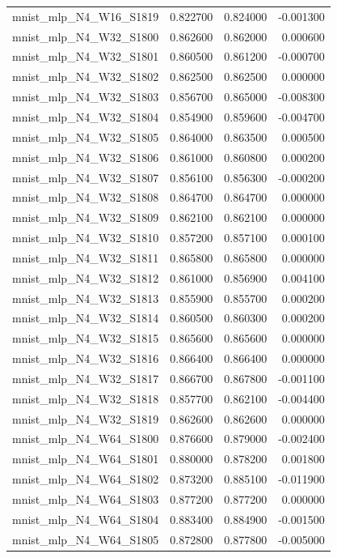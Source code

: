 \begin{tabular}{lrrr}
mnist_mlp_N4_W16_S1819 & 0.822700 & 0.824000 & -0.001300 \\
mnist_mlp_N4_W32_S1800 & 0.862600 & 0.862000 & 0.000600 \\
mnist_mlp_N4_W32_S1801 & 0.860500 & 0.861200 & -0.000700 \\
mnist_mlp_N4_W32_S1802 & 0.862500 & 0.862500 & 0.000000 \\
mnist_mlp_N4_W32_S1803 & 0.856700 & 0.865000 & -0.008300 \\
mnist_mlp_N4_W32_S1804 & 0.854900 & 0.859600 & -0.004700 \\
mnist_mlp_N4_W32_S1805 & 0.864000 & 0.863500 & 0.000500 \\
mnist_mlp_N4_W32_S1806 & 0.861000 & 0.860800 & 0.000200 \\
mnist_mlp_N4_W32_S1807 & 0.856100 & 0.856300 & -0.000200 \\
mnist_mlp_N4_W32_S1808 & 0.864700 & 0.864700 & 0.000000 \\
mnist_mlp_N4_W32_S1809 & 0.862100 & 0.862100 & 0.000000 \\
mnist_mlp_N4_W32_S1810 & 0.857200 & 0.857100 & 0.000100 \\
mnist_mlp_N4_W32_S1811 & 0.865800 & 0.865800 & 0.000000 \\
mnist_mlp_N4_W32_S1812 & 0.861000 & 0.856900 & 0.004100 \\
mnist_mlp_N4_W32_S1813 & 0.855900 & 0.855700 & 0.000200 \\
mnist_mlp_N4_W32_S1814 & 0.860500 & 0.860300 & 0.000200 \\
mnist_mlp_N4_W32_S1815 & 0.865600 & 0.865600 & 0.000000 \\
mnist_mlp_N4_W32_S1816 & 0.866400 & 0.866400 & 0.000000 \\
mnist_mlp_N4_W32_S1817 & 0.866700 & 0.867800 & -0.001100 \\
mnist_mlp_N4_W32_S1818 & 0.857700 & 0.862100 & -0.004400 \\
mnist_mlp_N4_W32_S1819 & 0.862600 & 0.862600 & 0.000000 \\
mnist_mlp_N4_W64_S1800 & 0.876600 & 0.879000 & -0.002400 \\
mnist_mlp_N4_W64_S1801 & 0.880000 & 0.878200 & 0.001800 \\
mnist_mlp_N4_W64_S1802 & 0.873200 & 0.885100 & -0.011900 \\
mnist_mlp_N4_W64_S1803 & 0.877200 & 0.877200 & 0.000000 \\
mnist_mlp_N4_W64_S1804 & 0.883400 & 0.884900 & -0.001500 \\
mnist_mlp_N4_W64_S1805 & 0.872800 & 0.877800 & -0.005000 \\

\end{tabular}
